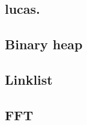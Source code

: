 \subsection{lucas.}
\raggedbottom
\hrulefill

\subsection{Binary heap}
\raggedbottom
\hrulefill

\subsection{Linklist}
\raggedbottom
\hrulefill

\subsection{FFT}
\raggedbottom
\hrulefill

